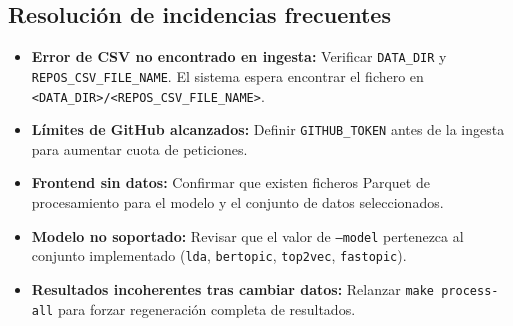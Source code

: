 \subsection{Resolución de incidencias frecuentes}
\begin{itemize}
    \item \textbf{Error de CSV no encontrado en ingesta:} Verificar \texttt{DATA\_DIR} y \texttt{REPOS\_CSV\_FILE\_NAME}. El sistema espera encontrar el fichero en \texttt{<DATA\_DIR>/<REPOS\_CSV\_FILE\_NAME>}.
    \item \textbf{Límites de GitHub alcanzados:} Definir \texttt{GITHUB\_TOKEN} antes de la ingesta para aumentar cuota de peticiones.
    \item \textbf{Frontend sin datos:} Confirmar que existen ficheros Parquet de procesamiento para el modelo y el conjunto de datos seleccionados.
    \item \textbf{Modelo no soportado:} Revisar que el valor de \texttt{--model} pertenezca al conjunto implementado (\texttt{lda}, \texttt{bertopic}, \texttt{top2vec}, \texttt{fastopic}).
    \item \textbf{Resultados incoherentes tras cambiar datos:} Relanzar \texttt{make process-all} para forzar regeneración completa de resultados.
\end{itemize}

